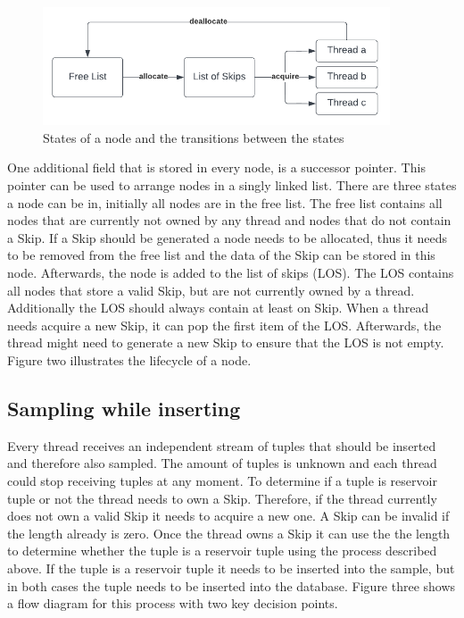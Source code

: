 \documentclass[acmlarge,nonacm]{acmart}
\begin{document}
        \begin{figure}[h]
            \includegraphics[height=3.5cm]{figure2.pdf}
            \caption{States of a node and the transitions between the states}
        \end{figure}
        One additional field that is stored in every node, is a successor pointer. This pointer can be used to arrange nodes in a singly linked list. There are three states a node can be in, initially all nodes are in the free list. The free list contains all nodes that are currently not owned by any thread and nodes that do not contain a Skip. If a Skip should be generated a node needs to be allocated, thus it needs to be removed from the free list and the data of the Skip can be stored in this node. Afterwards, the node is added to the list of skips (LOS). The LOS contains all nodes that store a valid Skip, but are not currently owned by a thread. Additionally the LOS should always contain at least on Skip. When a thread needs acquire a new Skip, it can pop the first item of the LOS. Afterwards, the thread might need to generate a new Skip to ensure that the LOS is not empty. Figure two illustrates the lifecycle of a node.

    \subsection{Sampling while inserting}

        Every thread receives an independent stream of tuples that should be inserted and therefore also sampled. The amount of tuples is unknown and each thread could stop receiving tuples at any moment. To determine if a tuple is reservoir tuple or not the thread needs to own a Skip. Therefore, if the thread currently does not own a valid Skip it needs to acquire a new one. A Skip can be invalid if the length already is zero. Once the thread owns a Skip it can use the the length to determine whether the tuple is a reservoir tuple using the process described above. If the tuple is a reservoir tuple it needs to be inserted into the sample, but in both cases the tuple needs to be inserted into the database. Figure three shows a flow diagram for this process with two key decision points. 
\end{document}
